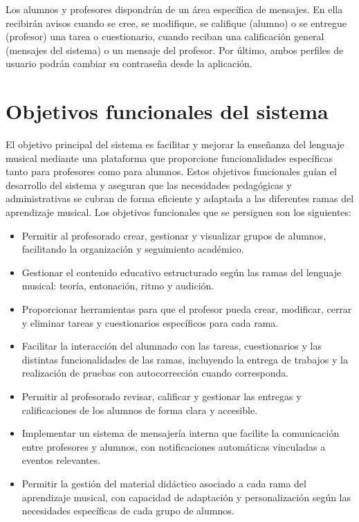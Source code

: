 Los alumnos y profesores dispondrán de un área específica de mensajes. En ella recibirán avisos cuando se cree, se modifique, se califique (alumno) o se entregue (profesor) una tarea o cuestionario, cuando reciban una calificación general (mensajes del sistema) o un mensaje del profesor. Por último, ambos perfiles de usuario podrán cambiar su contraseña desde la aplicación.
\section{Objetivos funcionales del sistema}
El objetivo principal del sistema es facilitar y mejorar la enseñanza del lenguaje musical mediante una plataforma que proporcione funcionalidades específicas tanto para profesores como para alumnos. Estos objetivos funcionales guían el desarrollo del sistema y aseguran que las necesidades pedagógicas y administrativas se cubran de forma eficiente y adaptada a las diferentes ramas del aprendizaje musical.
Los objetivos funcionales que se persiguen son los siguientes: 

\begin{itemize}
  \item Permitir al profesorado crear, gestionar y visualizar grupos de alumnos, facilitando la organización y seguimiento académico.
  \item Gestionar el contenido educativo estructurado según las ramas del lenguaje musical: teoría, entonación, ritmo y audición.
  \item Proporcionar herramientas para que el profesor pueda crear, modificar, cerrar y eliminar tareas y cuestionarios específicos para cada rama.
  \item Facilitar la interacción del alumnado con las tareas, cuestionarios y las distintas funcionalidades de las ramas, incluyendo la entrega de trabajos y la realización de pruebas con autocorrección cuando corresponda.
  \item Permitir al profesorado revisar, calificar y gestionar las entregas y calificaciones de los alumnos de forma clara y accesible.
  \item Implementar un sistema de mensajería interna que facilite la comunicación entre profesores y alumnos, con notificaciones automáticas vinculadas a eventos relevantes.
  \item Permitir la gestión del material didáctico asociado a cada rama del aprendizaje musical, con capacidad de adaptación y personalización según las necesidades específicas de cada grupo de alumnos.
\end{itemize}

